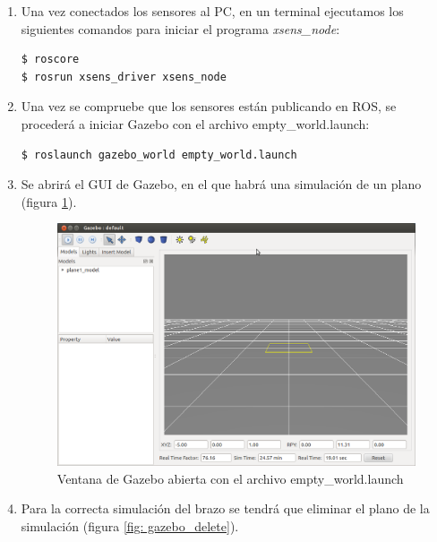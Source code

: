 \documentclass[12pt, a4paper]{report}
\begin{document}
\begin{enumerate}
\item Una vez conectados los sensores al PC, en un terminal ejecutamos los siguientes comandos para iniciar el programa \textit{xsens\_node}:

\begin{verbatim}
$ roscore
$ rosrun xsens_driver xsens_node
\end{verbatim}

\item Una vez se compruebe que los sensores están publicando en ROS, se procederá a iniciar Gazebo con el archivo empty\_world.launch:

\begin{verbatim}
$ roslaunch gazebo_world empty_world.launch
\end{verbatim}

\item Se abrirá el GUI de Gazebo, en el que habrá una simulación de un plano (figura \ref{fig: gazebo_empty}). 


\begin{figure}
	\centering
		\includegraphics[scale=0.3]{../img/gazebo_empty.png} 
	\caption[Ventana de Gazebo abierta con el archivo empty\_world.launch]{Ventana de Gazebo abierta con el archivo empty\_world.launch} 
	\label{fig: gazebo_empty}
\end{figure}

\item Para la correcta simulación del brazo se tendrá que eliminar el plano de la simulación (figura \ref{fig: gazebo_delete}).


\end{enumerate}
\end{document}

